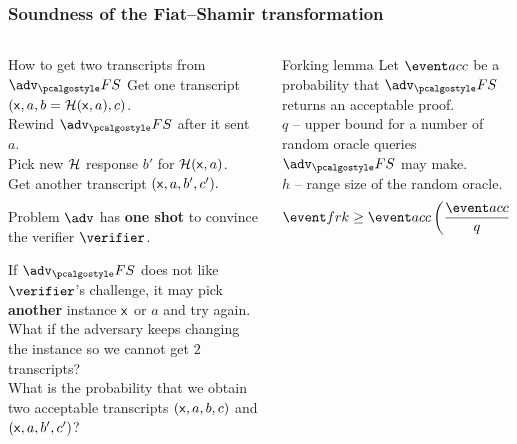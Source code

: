 \documentclass[aspectratio=169]{beamer}
\renewcommand{\emph}[1]{\textbf{#1}}
\newcommand{\advfs}{\adv_\fs}
\renewcommand{\myskip}{0.5\baselineskip}
\begin{document}
\begin{frame}
  \frametitle{Soundness of the Fiat--Shamir transformation}
  \begin{columns}
    \begin{column}{0.5\linewidth}
  \begin{block}{How to get two transcripts from $\advfs$}
    Get one transcript $(\mathsf{x}, a, b = \mathcal{H}(\mathsf{x}, a), c)$.\\
    Rewind $\advfs$ after it sent $a$.\\
    Pick new $\mathcal{H}$ response $b'$ for $\mathcal{H}(\mathsf{x}, a)$.\\
    Get another transcript $(\mathsf{x}, a, b', c').$
  \end{block}\pause
  
  \begin{block}{Problem}
    $\adv$ has \emph{one shot} to convince the verifier $\verifier$.

    If $\advfs$ does not like $\verifier$'s challenge, it may pick \emph{another}
    instance $\mathsf{x}$ or $a$ and try again.\\[\myskip]
    What if the adversary keeps changing the instance so we cannot get $2$
    transcripts?\\[\myskip]
    What is the probability that we obtain two acceptable transcripts $(\mathsf{x}, a,
    b, c)$ and $(\mathsf{x}, a, b', c')$?
  \end{block}
\end{column}\pause
\begin{column}{0.5\linewidth}
  \begin{block}{Forking lemma}
    Let $\accProb$ be a probability that $\advfs$ returns an acceptable proof.\\
    $q$ -- upper bound for a number of random oracle queries $\advfs$ may
    make.\\
    $h$ -- range size of the random oracle.
    \[
      \frkProb \geq \accProb \left(\frac{\accProb}{q} - \frac{1}{h}\right).
    \]
  \end{block}
\end{column}
\end{columns}
\vspace*{0.0cm}
\centering{}
\end{frame}
\end{document}
